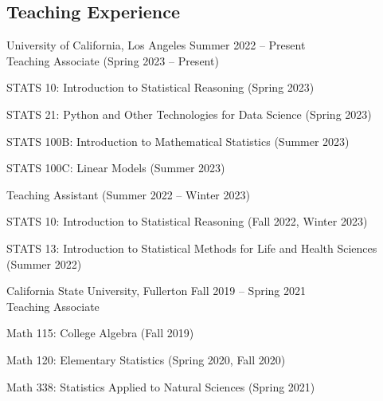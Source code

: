 \documentclass[margin,line]{res}
\newenvironment{list1}{
  \begin{list}{\ding{113}}{
      \setlength{\itemsep}{0in}
      \setlength{\parsep}{0in} \setlength{\parskip}{0in}
      \setlength{\topsep}{0in} \setlength{\partopsep}{0in} 
      \setlength{\leftmargin}{0.20in}}}{\end{list}}
\begin{document}
\begin{resume}
\section{\sc Teaching Experience}
{\sc University of California, Los Angeles} \hfill{Summer 2022 -- Present} \\[5pt]
Teaching Associate (Spring 2023 -- Present)\\[-0.3cm]
\begin{list1}
\itemsep5pt
	\item[] STATS 10: Introduction to Statistical Reasoning \hspace{1ex} (Spring 2023)
	\item[] STATS 21: Python and Other Technologies for Data Science \hspace{1ex} (Spring 2023)
	\item[] STATS 100B: Introduction to Mathematical Statistics \hspace{1ex} (Summer 2023)
	\item[] STATS 100C: Linear Models \hspace{1ex} (Summer 2023)
\end{list1}

Teaching Assistant (Summer 2022 -- Winter 2023)\\[-0.3cm]
\begin{list1}
\itemsep5pt
	\item[] STATS 10: Introduction to Statistical Reasoning \hspace{1ex} (Fall 2022, Winter 2023)
	\item[] STATS 13: Introduction to Statistical Methods for Life 
and Health Sciences \hspace{1ex} (Summer 2022)
\end{list1}

{\sc California State University, Fullerton} \hfill{Fall 2019 -- Spring 2021} \\ Teaching Associate\\[-0.3cm]
\begin{list1}
\itemsep5pt
	\item[] Math 115: College Algebra \hspace{1ex} (Fall 2019)
	\item[] Math 120: Elementary Statistics  \hspace{1ex} (Spring 2020, Fall 2020)
	\item[] Math 338: Statistics Applied to Natural Sciences  \hspace{1ex} (Spring 2021)
\end{list1}


\end{resume}
\end{document}
